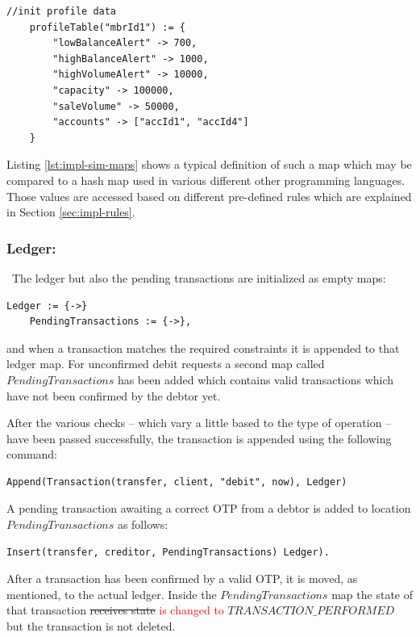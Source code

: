 \begin{center}
\begin{minipage}{0.8\textwidth}
\small
\begin{lstlisting}[language=bsl_lst,caption={\bf\small $MAP$ example showing a profile table entry},label={lst:impl-sim-maps} ]
	//init profile data
	profileTable("mbrId1") := {
		"lowBalanceAlert" -> 700,
		"highBalanceAlert" -> 1000,		
		"highVolumeAlert" -> 10000,
		"capacity" -> 100000,
		"saleVolume" -> 50000,
		"accounts" -> ["accId1", "accId4"]
	}
\end{lstlisting}
\end{minipage}
\end{center}

Listing \ref{lst:impl-sim-maps} shows a typical definition of such a map which may be compared to a hash map used in various different other programming languages. Those values are accessed based on different pre-defined rules which are explained in Section \ref{sec:impl-rules}.

\subsubsection{Ledger: }\ The ledger but also the pending transactions are initialized as empty maps:
\begin{lstlisting}[language=bsl]
	Ledger := {->}
	PendingTransactions := {->},
\end{lstlisting}
and when a transaction matches the required constraints it is appended to that ledger map. For unconfirmed debit requests a second map called $PendingTransactions$ has been added which contains valid transactions which have not been confirmed by the debtor yet.

After the various checks -- which vary a little based to the type of operation -- have been passed successfully, the transaction is appended using the following command:
\begin{lstlisting}[language=bsl]
	Append(Transaction(transfer, client, "debit", now), Ledger)
\end{lstlisting}

A pending transaction awaiting a correct OTP from a debtor is added to location $PendingTransactions$ as follows:
\begin{lstlisting}[language=bsl]
	Insert(transfer, creditor, PendingTransactions) Ledger).
\end{lstlisting}

After a transaction has been confirmed by a valid OTP, it is moved, as mentioned, to the actual ledger. Inside the $PendingTransactions$ map the state of that transaction \st{receives state} \textcolor{red}{is changed to}
$TRANSACTION\_PERFORMED$ but the transaction is not deleted.

